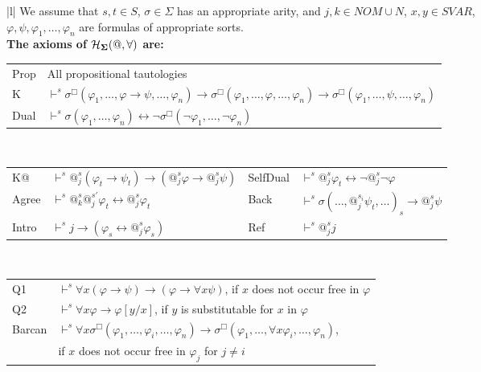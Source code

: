 \documentclass{easychair}
\theoremstyle{remark}
\begin{document}
{{
\footnotesize
\begin{table}[hbt!]
\hspace{9pt}
\small
\begin{tabular}{|l|}
\hline
We assume that $s,t\in S$,  $\sigma\in \Sigma$ has an appropriate arity, and  $j,k\in NOM\cup N$, $x,y\in SVAR$,\\ $\varphi, \psi, \varphi_1,\dots, \varphi_n$ are formulas of appropriate sorts.\\
\textbf{The axioms of $\mathcal{H}_{\bf \Sigma}(@, \forall)$ are:}\\
\begin{tabular}{l l}
Prop & All propositional tautologies \\
K & $\vdash^s \sigma^{\Box} (\varphi_1,\dots, \varphi \to \psi, \dots,\varphi_n) \to \sigma^{\Box} (\varphi_1,\dots, \varphi, \dots,\varphi_n) \to \sigma^{\Box} (\varphi_1,\dots, \psi, \dots,\varphi_n)$ \\
Dual & $\vdash^s \sigma(\varphi_1, \dots, \varphi_n) \leftrightarrow \neg \sigma^{\Box}(\neg \varphi_1, \dots, \neg \varphi_n)$ 
\end{tabular}\\
\begin{tabular}{l l l l}
K@ & $\vdash^s @_j^s (\varphi_t \to \psi_t) \to (@_j^s \varphi \to @_j^s \psi)$ & SelfDual & $\vdash^s @_j^s \varphi_t \leftrightarrow \neg @_j^s \neg \varphi$\\
Agree & $\vdash^s @_k^s @_j^{s'} \varphi_t \leftrightarrow @_j^s\varphi_t$ &
Back & $\vdash^s \sigma(\dots,@_j^{s_i} \psi_t,\dots)_s \to @_j^s \psi$ \\
Intro & $\vdash^s j \to (\varphi_s \leftrightarrow @_j^s \varphi_s)$  & Ref & $\vdash^s @_j^s j$ 
\end{tabular}\\
\begin{tabular}{l l}
Q1 & $\vdash^s \forall x (\varphi \to \psi) \to (\varphi \to \forall x \psi)$, if $x$ does not occur free in $\varphi$ \\
Q2 & $\vdash^s \forall x \varphi \to \varphi[y / x] $, if $y$ is substitutable for $x$ in $\varphi$ \\
Barcan & $\vdash^s \forall x \sigma^{\Box}(\varphi_1,\dots, \varphi_i, \dots,\varphi_n ) \to \sigma^{\Box}(\varphi_1,\dots, \forall x \varphi_i, \dots,\varphi_n)$, \\ & \quad  if $x$ does not occur free in $\varphi_j$ for $j \neq i$ 
\end{tabular}\\

\end{tabular}
\end{table}}}
\end{document}
